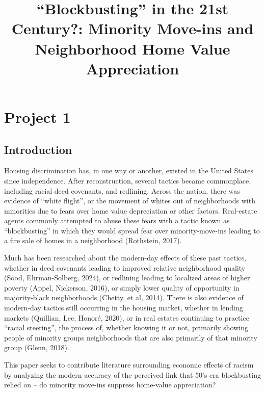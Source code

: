 \documentclass[11pt]{article}
\title{``Blockbusting'' in the 21st Century?: Minority Move-ins and
    Neighborhood Home Value
    Appreciation}
\begin{document}
    
    \maketitle
    
    

    
   
    \section{Project 1}\label{part-one}

    \subsection{Introduction}\label{introduction}

    Housing discrimination has, in one way or another, existed in the United
States since independence. After reconstruction, several tactics became
commonplace, including racial deed covenants, and redlining. Across the
nation, there was evidence of ``white flight'', or the movement of
whites out of neighborhoods with minorities due to fears over home value
depreciation or other factors. Real-estate agents commonly attempted to
abuse these fears with a tactic known as ``blockbusting'' in which they
would spread fear over minority-move-ins leading to a fire sale of homes
in a neighborhood (Rothstein, 2017).

Much has been researched about the modern-day effects of these past
tactics, whether in deed covenants leading to improved relative
neighborhood quality (Sood, Ehrman-Solberg, 2024), or redlining leading
to localized areas of higher poverty (Appel, Nickerson, 2016), or simply
lower quality of opportunity in majority-black neighborhoods (Chetty, et
al, 2014). There is also evidence of modern-day tactics still occurring
in the housing market, whether in lending markets (Quillian, Lee,
Honoré, 2020), or in real estates continuing to practice ``racial
steering'', the process of, whether knowing it or not, primarily showing
people of minority groups neighborhoods that are also primarily of that
minority group (Glenn, 2018). 

This paper seeks to contribute literature surrounding economic effects of racism 
by analyzing the modern accuracy of the perceived link that 50's era blockbusting relied
on -- do minority move-ins suppress home-value appreciation?
\end{document}
